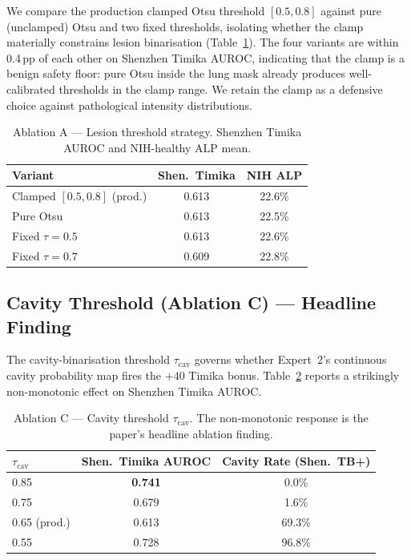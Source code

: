 \documentclass{article}
\begin{document}
We compare the production clamped Otsu threshold $[0.5, 0.8]$ against pure (unclamped) Otsu and two fixed thresholds, isolating whether the clamp materially constrains lesion binarisation (Table~\ref{tab:abl_otsu}). The four variants are within 0.4\,pp of each other on Shenzhen Timika AUROC, indicating that the clamp is a benign safety floor: pure Otsu inside the lung mask already produces well-calibrated thresholds in the clamp range. We retain the clamp as a defensive choice against pathological intensity distributions.

\begin{table}[t]
\caption{Ablation A --- Lesion threshold strategy. Shenzhen Timika AUROC and NIH-healthy ALP mean.}
\label{tab:abl_otsu}
\vskip 0.1in
\centering
\small
\begin{tabular}{lcc}
\toprule
Variant & Shen.\ Timika & NIH ALP \\
\midrule
Clamped $[0.5, 0.8]$ (prod.) & 0.613 & 22.6\% \\
Pure Otsu & 0.613 & 22.5\% \\
Fixed $\tau = 0.5$ & 0.613 & 22.6\% \\
Fixed $\tau = 0.7$ & 0.609 & 22.8\% \\
\bottomrule
\end{tabular}
\end{table}

\subsection{Cavity Threshold (Ablation C) --- Headline Finding}
\label{sec:abl_C}

The cavity-binarisation threshold $\tau_{\text{cav}}$ governs whether Expert~2's continuous cavity probability map fires the $+40$ Timika bonus. Table~\ref{tab:abl_cav} reports a strikingly non-monotonic effect on Shenzhen Timika AUROC.

\begin{table}[t]
\caption{Ablation C --- Cavity threshold $\tau_{\text{cav}}$. The non-monotonic response is the paper's headline ablation finding.}
\label{tab:abl_cav}
\vskip 0.1in
\centering
\small
\begin{tabular}{lcc}
\toprule
$\tau_{\text{cav}}$ & Shen.\ Timika AUROC & Cavity Rate (Shen.\ TB+) \\
\midrule
0.85 & \textbf{0.741} & 0.0\% \\
0.75 & 0.679 & 1.6\% \\
0.65 (prod.) & 0.613 & 69.3\% \\
0.55 & 0.728 & 96.8\% \\
\bottomrule
\end{tabular}
\end{table}
\end{document}
